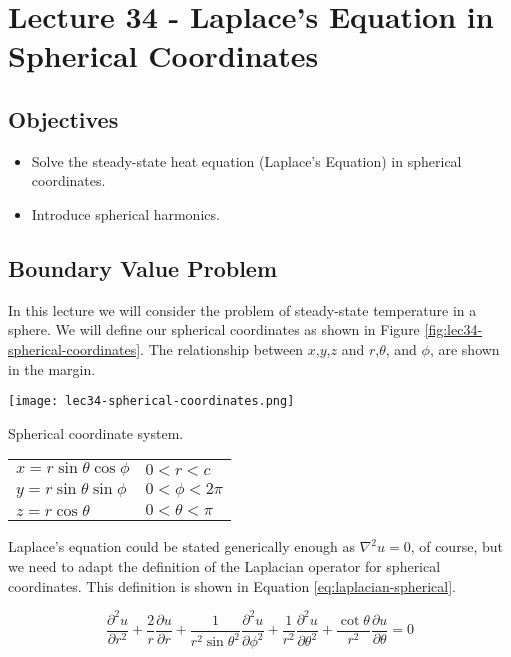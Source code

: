 \chapter{Lecture 34 - Laplace's Equation in Spherical Coordinates}
\label{ch:lec34}
\section{Objectives}
\begin{itemize}
\item Solve the steady-state heat equation (Laplace's Equation) in spherical coordinates. 
\item Introduce spherical harmonics.
\end{itemize}
\setcounter{lstannotation}{0}

\section{Boundary Value Problem}

In this lecture we will consider the problem of steady-state temperature in a sphere.  We will define our spherical coordinates as shown in Figure \ref{fig:lec34-spherical-coordinates}.  The relationship between $x$,$y$,$z$ and $r$,$\theta$, and $\phi$, are shown in the margin.
\begin{marginfigure}
\texttt{[image: lec34-spherical-coordinates.png]}
\caption{Spherical coordinate system.}
\label{fig:lec34-spherical-coordinates}
\end{marginfigure}
\begin{margintable}
\begin{tabular}{l l}
$x = r\sin{\theta}\cos{\phi}$ & $0<r<c$ \\
$y = r\sin{\theta}\sin{\phi}$ & $0< \phi < 2\pi$ \\
$z = r\cos{\theta}$ & $0 < \theta < \pi$ \\
\end{tabular}
\end{margintable}

Laplace's equation could be stated generically enough as $\nabla^2u = 0$, of course, but we need to adapt the definition of the Laplacian operator for spherical coordinates.  This definition is shown in Equation \ref{eq:laplacian-spherical}.

\begin{equation}
\frac{\partial^2 u}{\partial r^2} + \frac{2}{r}\frac{\partial u}{\partial r} + \frac{1}{r^2 \sin{\theta}^2} \frac{\partial^2 u}{\partial \phi^2} + \frac{1}{r^2}\frac{\partial^2 u}{\partial \theta^2} + \frac{\cot{\theta}}{r^2}\frac{\partial u}{\partial \theta} = 0
\label{eq:laplacian-spherical}
\end{equation}

